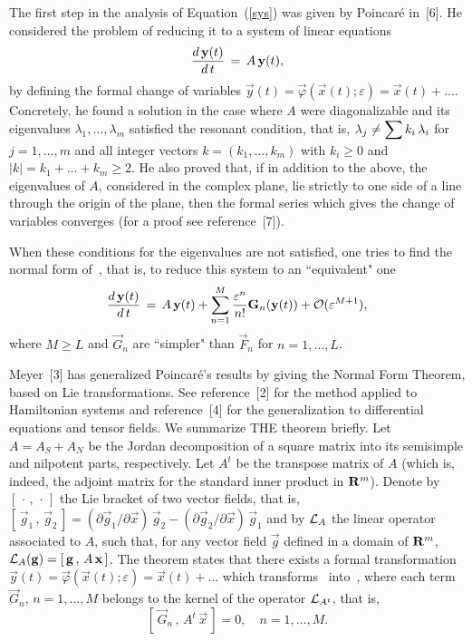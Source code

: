 The first step in the analysis of Equation~(\ref{sys}) was given by
Poincar\'e in~[6]. He considered the problem of reducing it to a system of
linear equations
$$\Frac{d\,\Vec{y}(t)}{d\,t}\,=\,A\,\Vec{y}(t),$$
by defining the formal change of variables
$\Vec{y}(t)=\Vec{\varphi}(\Vec{x}(t);\varepsilon)=\Vec{x}(t)+\ldots$.
Concretely, he
found a solution in the case where $A$ were diagonalizable and its eigenvalues
$\lambda_1,\ldots,\lambda_m$ satisfied the resonant condition, that is,
$\lambda_j\neq\Sum
k_i\,\lambda_i$ for
$j=1,\ldots,m$ and all integer vectors $k=(k_1,\ldots,k_m)$ with $k_i\ge0$ and
$|k|=k_1+\ldots+k_m\ge 2$. He also proved that, if in addition to
the above, the eigenvalues of $A$, considered in the complex plane, lie
strictly to one side
of a line through the origin of the plane, then the formal series  which
gives the change of variables converges (for a proof see reference~[7]).

When these conditions for the eigenvalues are not satisfied, one tries to
find the
normal form of~, that is, to reduce this system to an
``equivalent" one
\begin{equation}
\Frac{d\,\Vec{y}(t)}{d\,t}\,=\,A\,\Vec{y}(t)+
   \Sum_{n=1}^M\Frac{\varepsilon^n}{n!}\Vec{G}_n(\Vec{y}(t))+{\cal
O}(\varepsilon^{M+1}),\label{sys2}
\end{equation}
where $M\ge L$ and $\Vec{G}_n$ are ``simpler" than $\Vec{F}_n$ for
$n=1,\ldots,L$.

Meyer~[3] has generalized Poincar\'e's results by giving the Normal Form
Theorem, based on Lie
transformations. See reference~[2] for the method applied to Hamiltonian
systems and
reference~[4] for the generalization to differential equations and tensor
fields. We summarize THE
theorem briefly. Let $A=A_S+A_N$ be the Jordan decomposition of a square
matrix into its semisimple
and nilpotent parts, respectively. Let $A^t$ be the transpose matrix of $A$
(which is, indeed, the
adjoint matrix for the standard inner product
in ${\bf R}^m$). Denote by $[\,\cdot\,,\,\cdot\,]$ the Lie bracket of two
vector fields, that is,
$[\,\Vec{g}_1\,,\,\Vec{g}_2\,]=(\partial{\Vec{g}_1}/\partial{\Vec{x}})\,\Vec{g}_
2
-(\partial{\Vec{g}_2}/\partial{\Vec{x}})\,\Vec{g}_1$
and by
${\cal L}_A$ the linear operator associated to $A$, such that, for any
vector field
$\Vec{g}$ defined in a domain of
${\bf R}^m$,
${\cal L}_A(\Vec{g})=[\,\Vec{g}\,,\,A\,\Vec{x}\,]$. The theorem states that
there exists a formal transformation
$\Vec{y}(t)=\Vec{\varphi}(\Vec{x}(t);\varepsilon)=\Vec{x}(t)+\ldots$ which
transforms~ into~, where each term $\Vec{G}_n$, $n=1,
\ldots,M$  belongs to the kernel of the operator ${\cal L}_{A^t}$, that is,
\begin{equation}\label{theo}
[\,\Vec{G}_n\,,\,A^t\,\Vec{x}\,]=0, \quad n=1,\ldots,M.\end{equation}

